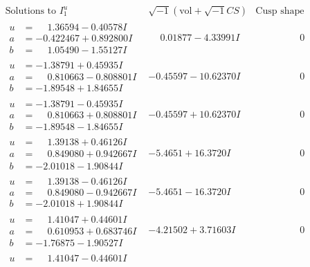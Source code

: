 \documentclass[1p]{elsarticle_modified}
\theoremstyle{definition}
\newcommand{\I}{\sqrt{-1}}
\begin{document}
$$\begin{array}{c|c|c}
\text{Solutions to }I^u_{1}& \I (\text{vol} + \sqrt{-1}CS) & \text{Cusp shape}\\
 \hline 
\begin{aligned}
u &= \phantom{-}1.36594 - 0.40578 I \\
a &= -0.422467 + 0.892800 I \\
b &= \phantom{-}1.05490 - 1.55127 I\end{aligned}
 & \phantom{-}0.01877 - 4.33991 I & \phantom{-0.000000 } 0 \\ \hline\begin{aligned}
u &= -1.38791 + 0.45935 I \\
a &= \phantom{-}0.810663 - 0.808801 I \\
b &= -1.89548 + 1.84655 I\end{aligned}
 & -0.45597 - 10.62370 I & \phantom{-0.000000 } 0 \\ \hline\begin{aligned}
u &= -1.38791 - 0.45935 I \\
a &= \phantom{-}0.810663 + 0.808801 I \\
b &= -1.89548 - 1.84655 I\end{aligned}
 & -0.45597 + 10.62370 I & \phantom{-0.000000 } 0 \\ \hline\begin{aligned}
u &= \phantom{-}1.39138 + 0.46126 I \\
a &= \phantom{-}0.849080 + 0.942667 I \\
b &= -2.01018 - 1.90844 I\end{aligned}
 & -5.4651 + 16.3720 I & \phantom{-0.000000 } 0 \\ \hline\begin{aligned}
u &= \phantom{-}1.39138 - 0.46126 I \\
a &= \phantom{-}0.849080 - 0.942667 I \\
b &= -2.01018 + 1.90844 I\end{aligned}
 & -5.4651 - 16.3720 I & \phantom{-0.000000 } 0 \\ \hline\begin{aligned}
u &= \phantom{-}1.41047 + 0.44601 I \\
a &= \phantom{-}0.610953 + 0.683746 I \\
b &= -1.76875 - 1.90527 I\end{aligned}
 & -4.21502 + 3.71603 I & \phantom{-0.000000 } 0 \\ \hline\begin{aligned}
u &= \phantom{-}1.41047 - 0.44601 I \\

\end{aligned}
\end{array}$$
\end{document}
